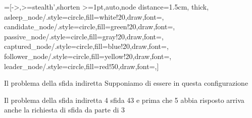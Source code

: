 =[->,>=stealth',shorten >=1pt,auto,node distance=1.5cm,
  thick,
  asleep_node/.style={circle,fill=white!20,draw,font=\sffamily\Large\bfseries},
  candidate_node/.style={circle,fill=green!20,draw,font=\sffamily\Large\bfseries},
  passive_node/.style={circle,fill=gray!20,draw,font=\sffamily\Large\bfseries},
  captured_node/.style={circle,fill=blue!20,draw,font=\sffamily\Large\bfseries},
  follower_node/.style={circle,fill=yellow!20,draw,font=\sffamily\Large\bfseries},
  leader_node/.style={circle,fill=red!50,draw,font=\sffamily\Large\bfseries},]

\begin{frame}{Il problema della sfida indiretta}
Supponiamo di essere in questa configurazione


\begin{center}
\end{center} 
\end{frame}

\begin{frame}{Il problema della sfida indiretta}
 4 sfida 43 e prima che 5 abbia risposto arriva anche la richiesta di sfida da parte di 3

\begin{center}
\end{center}
\end{frame}


